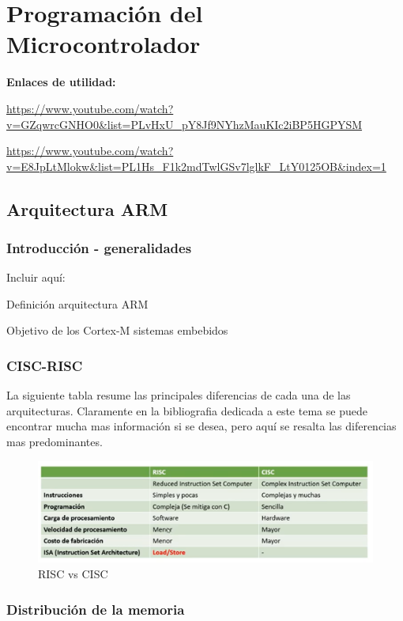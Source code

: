 \documentclass[a4paper,12pt]{report} %
\begin{document}
\chapter{Programación del Microcontrolador}


\textbf{Enlaces de utilidad:}

\url{https://www.youtube.com/watch?v=GZqwrcGNHO0&list=PLvHxU_pY8Jf9NYhzMauKIc2iBP5HGPYSM}

\url{https://www.youtube.com/watch?v=E8JpLtMlokw&list=PL1Hs_F1k2mdTwlGSv7lglkF_LtY0125OB&index=1}

\section{Arquitectura ARM}

\subsection{Introducción - generalidades}

Incluir aquí: 

Definición arquitectura ARM

Objetivo de los Cortex-M sistemas embebidos


\subsection{CISC-RISC}

La siguiente tabla resume las principales diferencias de cada una de las arquitecturas. Claramente en la bibliografia dedicada a este tema se puede encontrar mucha mas información si se desea, pero aquí se resalta las diferencias mas predominantes.

\begin{figure}[H]
	\centering
	\includegraphics[scale=0.45]{Imagenes/stm/risc-cisc}
	\caption{RISC vs CISC}
	\label{cr}
\end{figure}


\subsection{Distribución de la memoria}
\end{document}

